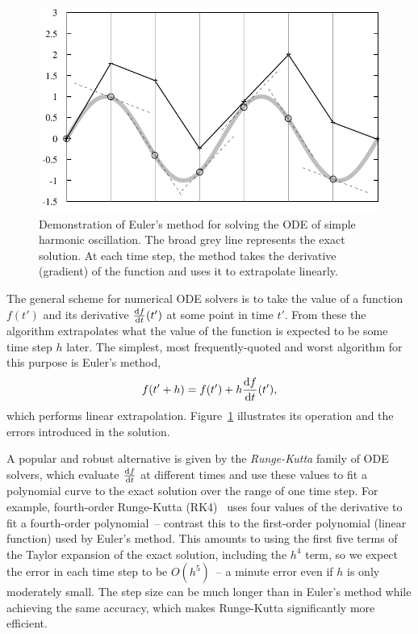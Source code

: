 \begin{figure}
\centerline{\includegraphics{figures/euler}}
\caption{Demonstration of Euler's method for solving the ODE of simple harmonic oscillation.
    The broad grey line represents the exact solution. At each time step, the method takes the
    derivative (gradient) of the function and uses it to extrapolate linearly.\label{eulersMethod}}
\end{figure}

The general scheme for numerical ODE solvers is to take the value of a function $f(t')$ and its
derivative $\frac{\mathrm{d} f}{\mathrm{d} t}(t')$ at some point in time $t'$. From these the algorithm
extrapolates what the value of the function is expected to be some time step $h$ later. The
simplest, most frequently-quoted and worst algorithm for this purpose is Euler's method,
\begin{equation}
f(t'+h) = f(t') + h\frac{\mathrm{d} f}{\mathrm{d} t}(t'),
\end{equation}
which performs linear extrapolation. Figure~\ref{eulersMethod} illustrates its operation and the
errors introduced in the solution.

A popular and robust alternative is given by the \emph{Runge-Kutta} family of ODE solvers, which
evaluate $\frac{\mathrm{d} f}{\mathrm{d} t}$ at different times and use these values to fit a polynomial
curve to the exact solution over the range of one time step. For example, fourth-order Runge-Kutta
(RK4)~\cite{NRinC} uses four values of the derivative to fit a fourth-order polynomial~-- contrast
this to the first-order polynomial (linear function) used by Euler's method. This amounts to using
the first five terms of the Taylor expansion of the exact solution, including the $h^4$ term, so
we expect the error in each time step to be $O(h^5)$~-- a minute error even if $h$ is only
moderately small. The step size can be much longer than in Euler's method while achieving the same
accuracy, which makes Runge-Kutta significantly more efficient.

